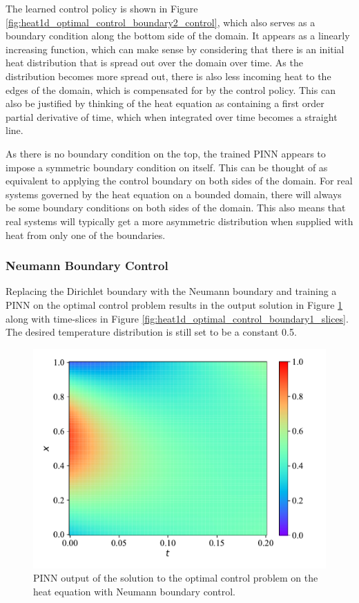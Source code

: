 The learned control policy is shown in Figure \ref{fig:heat1d_optimal_control_boundary2_control}, which also serves as a boundary condition along the bottom side of the domain. It appears as a linearly increasing function, which can make sense by considering that there is an initial heat distribution that is spread out over the domain over time. As the distribution becomes more spread out, there is also less incoming heat to the edges of the domain, which is compensated for by the control policy. This can also be justified by thinking of the heat equation as containing a first order partial derivative of time, which when integrated over time becomes a straight line.

As there is no boundary condition on the top, the trained PINN appears to impose a symmetric boundary condition on itself. This can be thought of as equivalent to applying the control boundary on both sides of the domain. For real systems governed by the heat equation on a bounded domain, there will always be some boundary conditions on both sides of the domain. This also means that real systems will typically get a more asymmetric distribution when supplied with heat from only one of the boundaries.

\subsubsection{Neumann Boundary Control}

Replacing the Dirichlet boundary with the Neumann boundary and training a PINN on the optimal control problem results in the output solution in Figure \ref{fig:heat1d_optimal_control_boundary1} along with time-slices in Figure \ref{fig:heat1d_optimal_control_boundary1_slices}. The desired temperature distribution is still set to be a constant 0.5.

\begin{figure}[H]
    \centering
    \includegraphics[width=1.0\linewidth]{Figures/IntermediateExperiments/OptimalControl/heat1d_optimal_control_boundary1.pdf}
    \caption{PINN output of the solution to the optimal control problem on the heat equation with Neumann boundary control.}
    \label{fig:heat1d_optimal_control_boundary1}
\end{figure}

